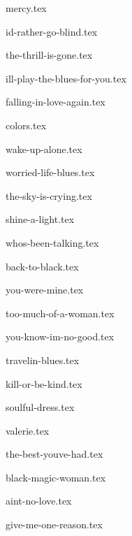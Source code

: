 \begin{songs}{}

  {mercy.tex}
  \sclearpage

  {id-rather-go-blind.tex}  
  \sclearpage

  {the-thrill-is-gone.tex}
  \sclearpage

  {ill-play-the-blues-for-you.tex}
  \sclearpage
      
  {falling-in-love-again.tex}  
  \sclearpage

  {colors.tex}
  \sclearpage

  {wake-up-alone.tex}
  \sclearpage

  {worried-life-blues.tex}
  \sclearpage

  {the-sky-is-crying.tex}
  \sclearpage

  {shine-a-light.tex}  
  \sclearpage

  {whos-been-talking.tex}
  \sclearpage

  {back-to-black.tex}
  \sclearpage
    
  {you-were-mine.tex}
  \sclearpage

  {too-much-of-a-woman.tex}
  \sclearpage

  {you-know-im-no-good.tex}
  \sclearpage

  {travelin-blues.tex}
  \sclearpage

  {kill-or-be-kind.tex}
  \sclearpage
  
  {soulful-dress.tex}
  \sclearpage

  {valerie.tex}
  \sclearpage
  
  {the-best-youve-had.tex}
  \sclearpage

  {black-magic-woman.tex}
  \sclearpage
  
  {aint-no-love.tex}
  \sclearpage
      
  {give-me-one-reason.tex}
  \sclearpage

    

\end{songs}

